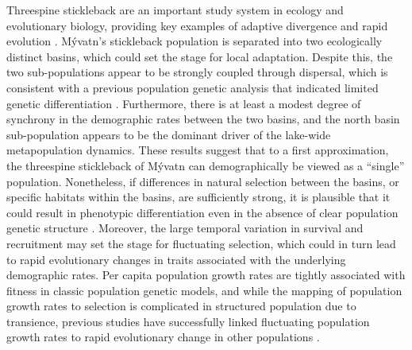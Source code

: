 \documentclass[11pt]{article}
\begin{document}
Threespine stickleback are an important study system in ecology and evolutionary biology,
providing key examples of adaptive divergence
\citep{hendry2002adaptive}
and rapid evolution
\citep{kitano2008reverse}.
M\'{y}vatn's stickleback population is separated into two ecologically distinct basins,
which could set the stage for local adaptation.
Despite this, the two sub-populations appear to be strongly coupled through dispersal,
which is consistent with a previous population genetic analysis that indicated limited
genetic differentiation \citep{millet2013}.
Furthermore, there is at least a modest degree of synchrony in the demographic
rates between the two basins,
and the north basin sub-population appears to be the dominant driver of the lake-wide
metapopulation dynamics.
These results suggest that to a first approximation,
the threespine stickleback of M\'{y}vatn can demographically
be viewed as a ``single'' population.
Nonetheless, if differences in natural selection between the basins,
or specific habitats within the basins,
are sufficiently strong,
it is plausible that it could result in phenotypic differentiation
even in the absence of clear population genetic structure
\citep{rasanen2008disentangling}.
Moreover, the large temporal variation in survival and recruitment may set the
stage for fluctuating selection,
which could in turn lead to rapid evolutionary changes in traits associated
with the underlying demographic rates.
Per capita population growth rates are tightly associated with fitness
in classic population genetic models,
and while the mapping of population growth rates to selection
is complicated in structured population due to transience,
previous studies have successfully linked
fluctuating population growth rates to rapid evolutionary change in other populations
\citep{coulson2008dynamics, engen2014estimating, de2019stage}.
\end{document}

